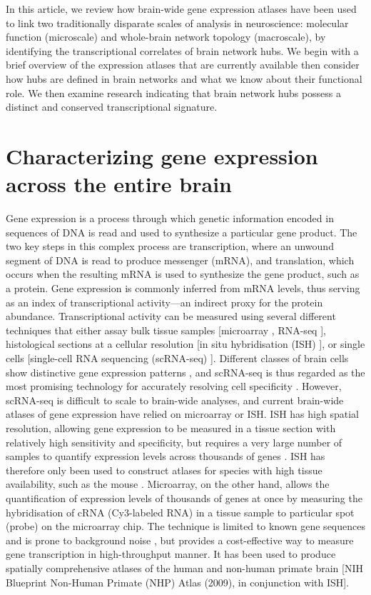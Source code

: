 In this article, we review how brain-wide gene expression atlases have been used to link two traditionally disparate scales of analysis in neuroscience: molecular function (microscale) and whole-brain network topology (macroscale), by identifying the transcriptional correlates of brain network hubs. We begin with a brief overview of the expression atlases that are currently available then consider how hubs are defined in brain networks and what we know about their functional role. We then examine research indicating that brain network hubs possess a distinct and conserved transcriptional signature.

\section{Characterizing gene expression across the entire brain}

Gene expression is a process through which genetic information encoded in sequences of DNA is read and used to synthesize a particular gene product.
The two key steps in this complex process are transcription, where an unwound segment of DNA is read to produce messenger (mRNA), and translation, which occurs when the resulting mRNA is used to synthesize the gene product, such as a protein. Gene expression is commonly inferred from mRNA levels, thus serving as an index of transcriptional activity---an indirect proxy for the protein abundance.
Transcriptional activity can be measured using several different techniques that either assay bulk tissue samples [microarray \citep{Schulze2001}, RNA-seq \citep{Mortazavi2008,Wang2009}], histological sections at a cellular resolution [in situ hybridisation (ISH) \citep{Schulze2001}], or single cells [single-cell RNA sequencing (scRNA-seq) \citep{Tang2009}].
Different classes of brain cells show distinctive gene expression patterns \citep{Darmanis2015,Tasic2016,Poulin2016,Mancarci2017}, and scRNA-seq is thus regarded as the most promising technology for accurately resolving cell specificity \citep{Yu2016}.
However, scRNA-seq is difficult to scale to brain-wide analyses, and current brain-wide atlases of gene expression have relied on microarray or ISH.
ISH has high spatial resolution, allowing gene expression to be measured in a tissue section with relatively high sensitivity and specificity, but requires a very large number of samples to quantify expression levels across thousands of genes \citep{Unger2010}.
ISH has therefore only been used to construct atlases for species with high tissue availability, such as the mouse \citep{Lein2007a}.
Microarray, on the other hand, allows the quantification of expression levels of thousands of genes at once by measuring the hybridisation of cRNA (Cy3-labeled RNA) in a tissue sample to particular spot (probe) on the microarray chip.
The technique is limited to known gene sequences and is prone to background noise \citep{Okoniewski2006,Royce2007}, but provides a cost-effective way to measure gene transcription in high-throughput manner. It has been used to produce spatially comprehensive atlases of the human \citep{Kang2011,Hawrylycz2012,Miller2014} and non-human primate brain [NIH Blueprint Non-Human Primate (NHP) Atlas (2009), in conjunction with ISH].

